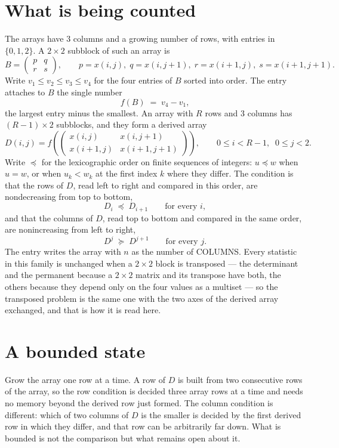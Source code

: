 \documentclass[11pt,a4paper]{article}
\theoremstyle{plain}
\theoremstyle{definition}
\begin{document}
\section{What is being counted}

The arrays have $3$ columns and a growing number of rows, with entries in $\{0,1,2\}$. A
$2\times2$ subblock of such an array is
\[
B=\begin{pmatrix} p & q \\ r & s \end{pmatrix},
\qquad p=x(i,j),\; q=x(i,j+1),\; r=x(i+1,j),\; s=x(i+1,j+1).
\]
Write $v_1\le v_2\le v_3\le v_4$ for the four entries of $B$ sorted into order. The entry attaches to $B$ the single number
\[
f(B)\;=\;v_4-v_1,
\]
the largest entry minus the smallest. An array with $R$ rows and $3$ columns has $(R-1)\times2$ subblocks, and they
form a derived array
\[
D(i,j)=f\!\left(\begin{pmatrix} x(i,j) & x(i,j+1) \\ x(i+1,j) & x(i+1,j+1)\end{pmatrix}
\right),\qquad 0\le i<R-1,\;\; 0\le j<2 .
\]
Write $\preceq$ for the lexicographic order on finite sequences of integers: $u\preceq w$ when
$u=w$, or when $u_k<w_k$ at the first index $k$ where they differ. The condition is that the
rows of $D$, read left to right and compared in this order, are nondecreasing from top to bottom,
\[
D_{i}\;\preceq\;D_{i+1}\qquad\text{for every } i,
\]
and that the columns of $D$, read top to bottom and compared in the same order, are nonincreasing
from left to right,
\[
D^{j}\;\succeq\;D^{j+1}\qquad\text{for every } j .
\] The entry writes the array with $n$ as the number of COLUMNS. Every statistic in this family is unchanged when a $2\times2$ block is transposed --- the determinant and the permanent because a $2\times2$ matrix and its transpose have both, the others because they depend only on the four values as a multiset --- so the transposed problem is the same one with the two axes of the derived array exchanged, and that is how it is read here.

\section{A bounded state}

Grow the array one row at a time. A row of $D$ is built from two consecutive rows of the array,
so the row condition is decided three array rows at a time and needs no memory beyond the
derived row just formed. The column condition is different: which of two columns of $D$ is the
smaller is decided by the first derived row in which they differ, and that row can be
arbitrarily far down. What is bounded is not the comparison but what remains open about it.
\end{document}
